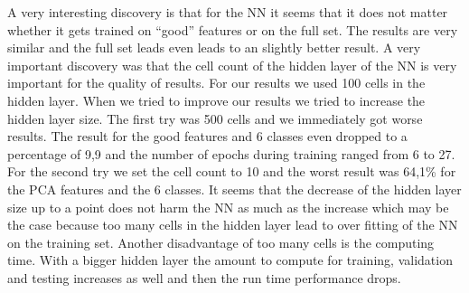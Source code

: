\documentclass[subfigure,epsfig,fleqn,float,ausarbeitung]{scrartcl}
\begin{document}
A very interesting discovery is that for the NN it seems that it does not matter whether it gets trained on “good” features or on the full set. The results are very similar and the full set leads even leads to an slightly better result. A very important discovery was that the cell count of the hidden layer of the NN is very important for the quality of results. For our results we used 100 cells in the hidden layer. When we tried to improve our results we tried to increase the hidden layer size. 
The first try was 500 cells and we immediately got worse results. The result for the good features and 6 classes even dropped to a percentage of 9,9 and the number of epochs during training ranged from 6 to 27.
For the second try we set the cell count to 10 and the worst result was 64,1\% for the PCA features and the 6 classes. It seems that the decrease of the hidden layer size up to a point does not harm the NN as much as the increase which may be the case because too many cells in the hidden layer lead to over fitting of the NN on the training set. Another disadvantage of too many cells is the computing time. With a bigger hidden layer the amount to compute for training, validation and testing increases as well and then the run time performance drops.
\end{document}
